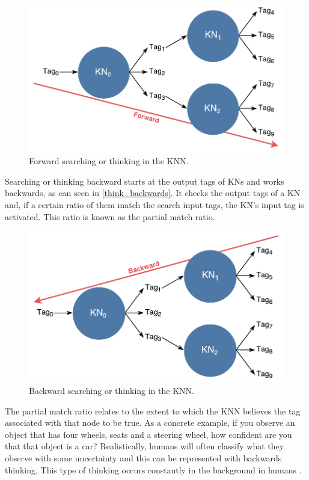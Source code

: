\documentclass[titlepage,11pt]{article}
\begin{document}
\begin{figure}[!htb]
	\includegraphics[width=\columnwidth]{figures/forward_search.pdf}
	\caption{Forward searching or thinking in the KNN.}
	\label{think_forwards}
\end{figure}

Searching or thinking backward starts at the output tags of KNs and works backwards, as can seen in \autoref{think_backwards}. It checks the output tags of a KN and, if a certain ratio of them match the search input tags, the KN's input tag is activated. This ratio is known as the partial match ratio.

\begin{figure}[!htb]
	\includegraphics[width=\columnwidth]{figures/backward_search.pdf}
	\caption{Backward searching or thinking in the KNN.}
	\label{think_backwards}
\end{figure}

The partial match ratio relates to the extent to which the KNN believes the tag associated with that node to be true. As a concrete example, if you observe an object that has four wheels, seats and a steering wheel, how confident are you that that object is a car? Realistically, humans will often classify what they observe with some uncertainty \cite{uncertainty} and this can be represented with backwards thinking. This type of thinking occurs constantly in the background in humans \cite{vybihal-knowledge}.
\end{document}
